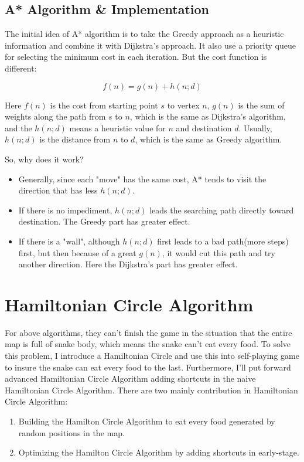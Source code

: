 \documentclass[12pt]{article}
\begin{document}
\subsection{A* Algorithm \& Implementation}

The initial idea of A* algorithm is to take the Greedy approach as a heuristic information and combine it with Dijkstra's approach. It also use a priority queue for selecting the minimum cost in each iteration. But the cost function is different:

\begin{equation*}
    f(n) = g(n) + h(n;d)
\end{equation*}

Here $f(n)$ is the cost from starting point $s$ to vertex $n$, $g(n)$ is the sum of weights 
along the path from $s$ to $n$, which is the same as Dijkstra's algorithm, and the $h(n;d)$ 
means a heuristic value for $n$ and destination $d$. Usually, $h(n;d)$ is the distance from $n$ 
to $d$, which is the same as Greedy algorithm.

So, why does it work?

\begin{itemize}
    \item Generally, since each "move" has the same cost, A* tends to visit the direction that has less $h(n;d)$.
    \item If there is no impediment, $h(n;d)$ leads the searching path directly toward destination. The Greedy part has greater effect.
    \item If there is a "wall", although $h(n;d)$ first leads to a bad path(more steps) first, but then because of a great $g(n)$, it would cut this path and try another direction. Here the Dijkstra's part has greater effect.
\end{itemize}

\section{Hamiltonian Circle Algorithm}

For above algorithms, they can't finish the game in the situation that the entire map is full of snake body, which means the snake can't eat every food. To solve this problem, I introduce a Hamiltonian Circle and use this into self-playing game to insure the snake can eat every food to the last. Furthermore, I'll put forward advanced Hamiltonian Circle Algorithm adding shortcuts in the naive Hamiltonian Circle Algorithm. There are two mainly contribution in Hamiltonian Circle Algorithm:
\begin{enumerate}
    \item Building the Hamilton Circle Algorithm to eat every food generated by random positions in the map. 
    \item Optimizing the Hamilton Circle Algorithm by adding shortcuts in early-stage.
\end{enumerate}
    
\end{document}
